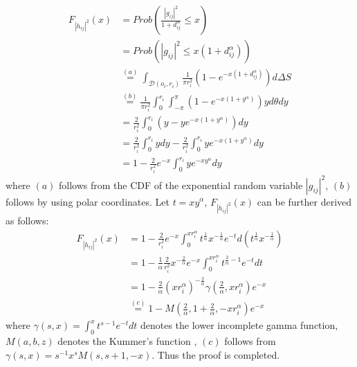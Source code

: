 \documentclass[journal]{IEEEtran}
\begin{document}
\begin{align}
F_{\left|h_{ij} \right|^2} \left(x\right) &= Prob\left(\frac{\left|g_{ij}\right|^2}{1 + d_{ij}^{\alpha}} \leq x \right) \nonumber \\
& = Prob \left(\left|g_{ij}\right|^2 \leq x \left(1 + d_{ij}^\alpha\right)\right) \nonumber \\
& \overset{\left(a\right)}{=} \int_{\mathcal{D}(o_i, r_i)} \frac{1}{\pi r_i^2}\left(1 - e^{-x\left(1 + d_{ij}^{\alpha}\right)}\right) d\Delta S \nonumber\\
& \overset{\left(b\right)}{=} \frac{1}{\pi r_i^2} \int_{0}^{r_i} \int_{-\pi}^{\pi}\left(1 - e^{-x\left(1 + y^{\alpha}\right)}\right)y d \theta d y \nonumber \\
& = \frac{2}{r_i^2}\int_{0}^{r_i} \left(y - ye^{-x\left(1 + y^\alpha\right)}\right) dy \nonumber \\
& = \frac{2}{r_i^2}\int_{0}^{r_i}y dy - \frac{2}{r_i^2}\int_{0}^{r_i} y e^{-x \left(1 + y^\alpha\right)}dy \nonumber \\
& = 1 - \frac{2}{r_i^2}e^{-x} \int_{0}^{r_i}y e^{-xy^{\alpha}}dy
\end{align}
where $\left(a\right)$ follows from the CDF of the exponential random variable $\left|g_{ij}\right|^2$, $\left(b\right)$ follows by using polar coordinates. Let $t = xy^{\alpha}$, $F_{\left|h_{ij} \right|^2} \left(x\right)$ can be further derived as follows:
\begin{align}
F_{\left|h_{ij} \right|^2} \left(x\right) &= 1 - \frac{2}{r_i^2}e^{-x} \int_{0}^{x r_i^{\alpha}} t^{\frac{1}{\alpha}} x^{-\frac{1}{\alpha}}e^{-t} d\left(t^{\frac{1}{\alpha}} x^{-\frac{1}{\alpha}}\right) \nonumber \\
& = 1 - \frac{1}{\alpha} \frac{2}{r_i^2} x^{-\frac{2}{\alpha}} e^{-x} \int_{0}^{x r_i^{\alpha}} t^{\frac{2}{\alpha} - 1}e^{-t} dt \nonumber \\
& = 1 - \frac{2}{\alpha} \left(x r_i^{\alpha}\right) ^{-\frac{2}{\alpha}} \gamma\left(\frac{2}{\alpha}, xr_i^{\alpha}\right)e^{-x} \nonumber \\
& \overset{\left(c\right)}{=} 1 - M\left(\frac{2}{\alpha}, 1 + \frac{2}{\alpha}, -xr_i^{\alpha}\right)e^{-x}
\end{align}
where $\gamma\left(s,x\right) = \int_{0}^{x}t^{s-1}e^{-t}dt$ denotes the lower incomplete gamma function, $M\left(a,b,z\right)$ denotes the Kummer's function \cite{MAbramowitz}, $\left(c\right)$ follows from $\gamma\left(s,x\right) = s^{-1} x^s M\left(s,s+1,-x\right)$. Thus the proof is completed. 
\end{document}
